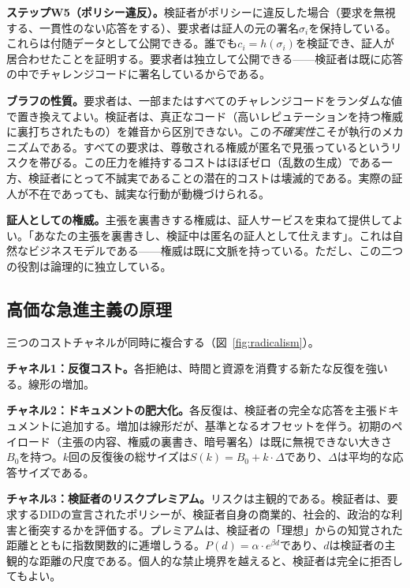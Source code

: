 \documentclass[11pt,a4paper,twocolumn]{article}
\begin{document}
\textbf{ステップW5（ポリシー違反）。}検証者がポリシーに違反した場合（要求を無視する、一貫性のない応答をする）、要求者は証人の元の署名$\sigma_i$を保持している。これらは付随データとして公開できる。誰でも$c_i = h(\sigma_i)$を検証でき、証人が居合わせたことを証明する。要求者は独立して公開できる——検証者は既に応答の中でチャレンジコードに署名しているからである。

\textbf{ブラフの性質。}要求者は、一部またはすべてのチャレンジコードをランダムな値で置き換えてよい。検証者は、真正なコード（高いレピュテーションを持つ権威に裏打ちされたもの）を雑音から区別できない。この\emph{不確実性}こそが執行のメカニズムである。すべての要求は、尊敬される権威が匿名で見張っているというリスクを帯びる。この圧力を維持するコストはほぼゼロ（乱数の生成）である一方、検証者にとって不誠実であることの潜在的コストは壊滅的である。実際の証人が不在であっても、誠実な行動が動機づけられる。

\textbf{証人としての権威。}主張を裏書きする権威は、証人サービスを束ねて提供してよい。「あなたの主張を裏書きし、検証中は匿名の証人として仕えます」。これは自然なビジネスモデルである——権威は既に文脈を持っている。ただし、この二つの役割は論理的に独立している。

\subsection{高価な急進主義の原理}

三つのコストチャネルが同時に複合する（図~\ref{fig:radicalism}）。

\textbf{チャネル1：反復コスト。}各拒絶は、時間と資源を消費する新たな反復を強いる。線形の増加。

\textbf{チャネル2：ドキュメントの肥大化。}各反復は、検証者の完全な応答を主張ドキュメントに追加する。増加は線形だが、基準となるオフセットを伴う。初期のペイロード（主張の内容、権威の裏書き、暗号署名）は既に無視できない大きさ$B_0$を持つ。$k$回の反復後の総サイズは$S(k) = B_0 + k \cdot \Delta$であり、$\Delta$は平均的な応答サイズである。

\textbf{チャネル3：検証者のリスクプレミアム。}リスクは主観的である。検証者は、要求するDIDの宣言されたポリシーが、検証者自身の商業的、社会的、政治的な利害と衝突するかを評価する。プレミアムは、検証者の「理想」からの知覚された距離とともに指数関数的に逓増しうる。$P(d) = \alpha \cdot e^{\beta d}$であり、$d$は検証者の主観的な距離の尺度である。個人的な禁止境界を越えると、検証者は完全に拒否してもよい。
\end{document}
